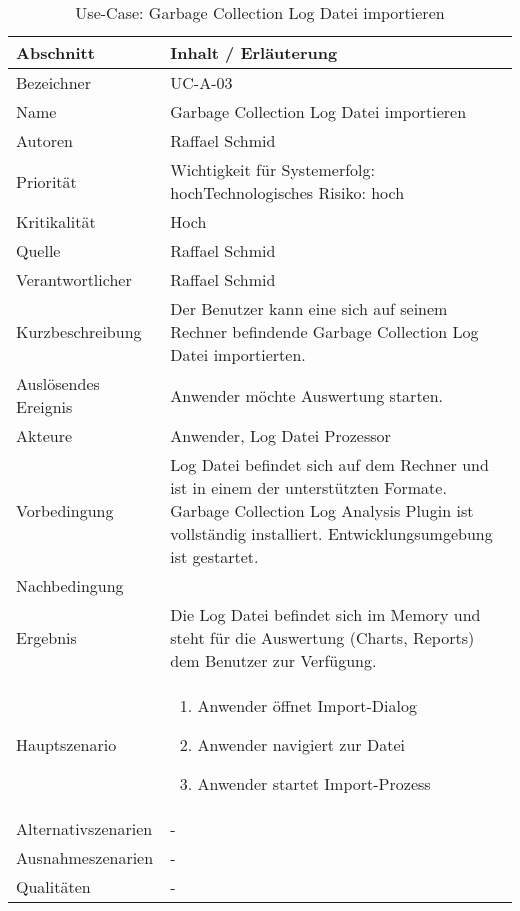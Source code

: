 \begin{longtable}{|p{4cm}|p{10.5cm}|}
\caption{Use-Case: Garbage Collection Log Datei importieren}\\\hline
   \textbf{Abschnitt} & \textbf{Inhalt / Erläuterung} \\\hline
   Bezeichner & UC-A-03\\\hline
   Name & Garbage Collection Log Datei importieren\\\hline
   Autoren & Raffael Schmid\\\hline
   Priorität & Wichtigkeit für Systemerfolg: hoch\newline Technologisches Risiko: hoch\\\hline
   Kritikalität & Hoch\\\hline
   Quelle & Raffael Schmid\\\hline
   Verantwortlicher & Raffael Schmid\\\hline
   Kurzbeschreibung & Der Benutzer kann eine sich auf seinem Rechner befindende Garbage Collection Log Datei importierten.\\\hline
   Auslösendes Ereignis & Anwender möchte Auswertung starten.\\\hline
   Akteure & Anwender, Log Datei Prozessor\\\hline
   Vorbedingung & Log Datei befindet sich auf dem Rechner und ist in einem der unterstützten Formate. Garbage Collection Log Analysis Plugin ist vollständig installiert. Entwicklungsumgebung ist gestartet.\\\hline
   Nachbedingung & \\\hline
   Ergebnis & Die Log Datei befindet sich im Memory und steht für die Auswertung (Charts, Reports) dem Benutzer zur Verfügung.\\\hline
   Hauptszenario & 
	\begin{enumerate}
		\item Anwender öffnet Import-Dialog
		\item Anwender navigiert zur Datei
		\item Anwender startet Import-Prozess
	\end{enumerate}
	\\\hline
   Alternativszenarien & -\\\hline
   Ausnahmeszenarien & -\\\hline
   Qualitäten & -\\\hline
\end{longtable}

